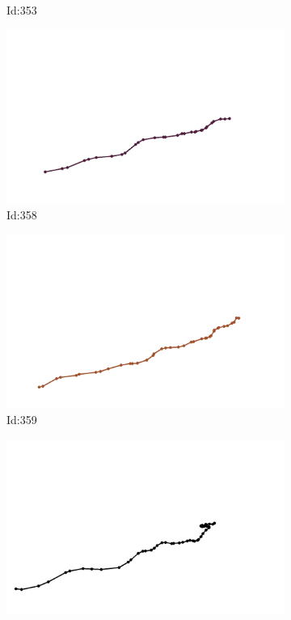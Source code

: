 \documentclass[12pt,twoside]{report}
\begin{document}
\begin{figure}
\begin{subfigure}[b]{0.20\textwidth}
\caption{Id:353}
\end{subfigure}
\begin{subfigure}[b]{0.20\textwidth}
\centering
\includegraphics[width=\textwidth]{../trajectories/358.png}
\caption{Id:358}
\end{subfigure}
\begin{subfigure}[b]{0.20\textwidth}
\centering
\includegraphics[width=\textwidth]{../trajectories/359.png}
\caption{Id:359}
\end{subfigure}
\begin{subfigure}[b]{0.20\textwidth}
\centering
\includegraphics[width=\textwidth]{../trajectories/364.png}

\end{subfigure}
\end{figure}
\end{document}
